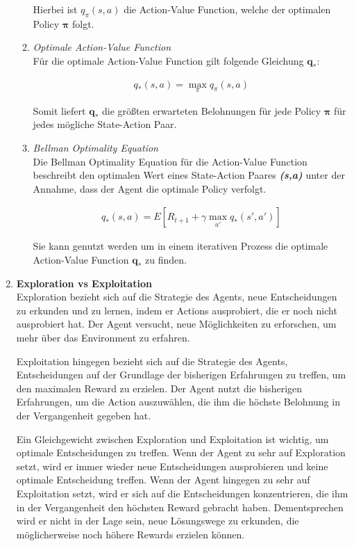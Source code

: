 \begin{enumerate}
\begin{enumerate}
        Hierbei ist $q_{\pi}(s,a)$ die Action-Value Function, welche der optimalen Policy {$\bm{\pi}$} folgt.

        \item \textit{Optimale Action-Value Function}\\
        Für die optimale Action-Value Function gilt folgende Gleichung $\bm{q_{*}}$:

        \begin{align}
            q_{*}(s,a)=\max_{\pi}q_{\pi}(s,a)
        \end{align}
    
        Somit liefert $\bm{q_{*}}$ die größten erwarteten Belohnungen für jede Policy {$\bm{\pi}$} für jedes mögliche State-Action Paar.


        \item \textit{Bellman Optimality Equation}\\
        Die Bellman Optimality Equation \cite{floydhubIntroductionQLearning} für die Action-Value Function beschreibt den optimalen Wert eines State-Action Paares \textbf{\textit{(s,a)}} unter der Annahme, dass der Agent die optimale Policy verfolgt.

        \begin{align}
        q_{*}(s,a)=E[R_{t+1}+\gamma \max_{a'} q_{*}(s', a')]
        \end{align}

        Sie kann genutzt werden um in einem iterativen Prozess die optimale Action-Value Function $\bm{q_{*}}$ zu finden.
    \end{enumerate}

    
    \item \textbf{Exploration vs Exploitation} \label{ExpvsExp}\\
    Exploration \cite{towardsdatascienceExplorationReinforcement} bezieht sich auf die Strategie des Agents, neue Entscheidungen zu erkunden und zu lernen, indem er Actions ausprobiert, die er noch nicht ausprobiert hat. Der Agent versucht, neue Möglichkeiten zu erforschen, um mehr über das Environment zu erfahren.

    Exploitation hingegen bezieht sich auf die Strategie des Agents, Entscheidungen auf der Grundlage der bisherigen Erfahrungen zu treffen, um den maximalen Reward zu erzielen. Der Agent nutzt die bisherigen Erfahrungen, um die Action auszuwählen, die ihm die höchste Belohnung in der Vergangenheit gegeben hat.
    
    Ein Gleichgewicht zwischen Exploration und Exploitation ist wichtig, um optimale Entscheidungen zu treffen. Wenn der Agent zu sehr auf Exploration setzt, wird er immer wieder neue Entscheidungen ausprobieren und keine optimale Entscheidung treffen. Wenn der Agent hingegen zu sehr auf Exploitation setzt, wird er sich auf die Entscheidungen konzentrieren, die ihm in der Vergangenheit den höchsten Reward gebracht haben. Dementsprechen wird er nicht in der Lage sein, neue Lösungswege zu erkunden, die möglicherweise noch höhere Rewards erzielen können.
    

\end{enumerate}
